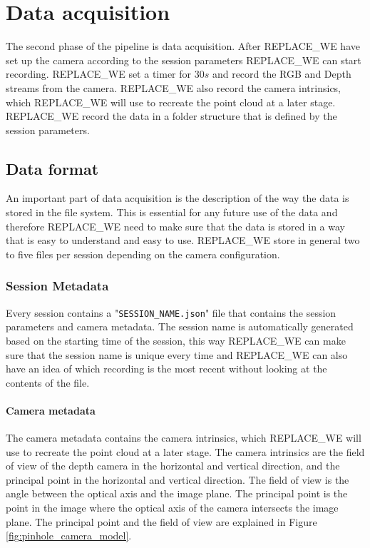 \section{Data acquisition}
\label{sec:data_acquisition}

The second phase of the pipeline is data acquisition. After REPLACE_WE have set up the camera according to the session parameters REPLACE_WE can start recording. REPLACE_WE set a timer for $30s$ and record the RGB and Depth streams from the camera. REPLACE_WE also record the camera intrinsics, which REPLACE_WE will use to recreate the point cloud at a later stage. REPLACE_WE record the data in a folder structure that is defined by the session parameters.

\subsection{Data format}

An important part of data acquisition is the description of the way the data is stored in the file system. This is essential for any future use of the data and therefore REPLACE_WE need to make sure that the data is stored in a way that is easy to understand and easy to use. REPLACE_WE store in general two to five files per session depending on the camera configuration. 

\subsubsection{Session Metadata}

Every session contains a "\texttt{SESSION\_NAME.json}" file that contains the session parameters and camera metadata. The session name is automatically generated based on the starting time of the session, this way REPLACE_WE can make sure that the session name is unique every time and REPLACE_WE can also have an idea of which recording is the most recent without looking at the contents of the file.

\paragraph{Camera metadata}

The camera metadata contains the camera intrinsics, which REPLACE_WE will use to recreate the point cloud at a later stage. The camera intrinsics are the field of view of the depth camera in the horizontal and vertical direction, and the principal point in the horizontal and vertical direction. The field of view is the angle between the optical axis and the image plane. The principal point is the point in the image where the optical axis of the camera intersects the image plane. The principal point and the field of view are explained in Figure \ref{fig:pinhole_camera_model}.

